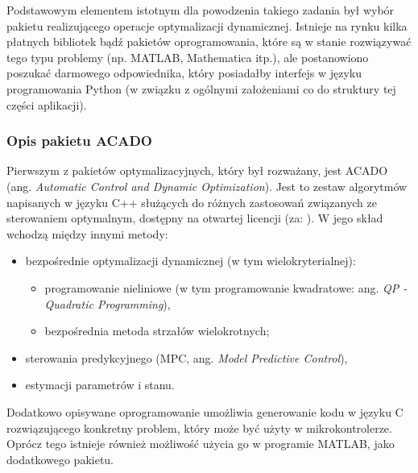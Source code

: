 Podstawowym elementem istotnym dla powodzenia takiego zadania był wybór pakietu realizującego operacje optymalizacji dynamicznej. Istnieje na rynku kilka płatnych bibliotek bądź pakietów oprogramowania, które są w stanie rozwiązywać tego typu problemy (np. MATLAB, Mathematica itp.), ale postanowiono poszukać darmowego odpowiednika, który posiadałby interfejs w języku programowania Python (w związku z ogólnymi założeniami co do struktury tej części aplikacji).


\subsubsection{Opis pakietu ACADO}

Pierwszym z pakietów optymalizacyjnych, który był rozważany, jest ACADO (ang. \emph{Automatic Control and Dynamic
Optimization}). Jest to zestaw algorytmów napisanych w języku C++ służących do różnych zastosowań związanych ze sterowaniem optymalnym, dostępny na otwartej licencji (za: \cite{Houska2011}). W jego skład wchodzą między innymi metody:
\begin{itemize}
    \item bezpośrednie optymalizacji dynamicznej (w tym wielokryterialnej):
        \begin{itemize}
            \item programowanie nieliniowe (w tym programowanie kwadratowe: ang. \emph{QP - Quadratic Programming}),
            \item bezpośrednia metoda strzałów wielokrotnych;
        \end{itemize}
    \item sterowania predykcyjnego (MPC, ang. \emph{Model Predictive Control}),
    \item estymacji parametrów i stanu.
\end{itemize}

Dodatkowo opisywane oprogramowanie umożliwia generowanie kodu w języku C rozwiązującego konkretny problem, który może być użyty w mikrokontrolerze. Oprócz tego istnieje również możliwość użycia go w programie MATLAB, jako dodatkowego pakietu.

